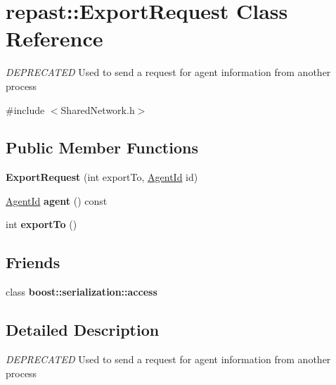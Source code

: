 \hypertarget{classrepast_1_1_export_request}{\section{repast\-:\-:Export\-Request Class Reference}
\label{classrepast_1_1_export_request}
}


{\itshape D\-E\-P\-R\-E\-C\-A\-T\-E\-D} Used to send a request for agent information from another process  




{\ttfamily \#include $<$Shared\-Network.\-h$>$}

\subsection*{Public Member Functions}
\begin{DoxyCompactItemize}
\item 
\hypertarget{classrepast_1_1_export_request_a108d76019feb5c21b7c5560f5da130df}{{\bfseries Export\-Request} (int export\-To, \hyperlink{classrepast_1_1_agent_id}{Agent\-Id} id)}\label{classrepast_1_1_export_request_a108d76019feb5c21b7c5560f5da130df}

\item 
\hypertarget{classrepast_1_1_export_request_a4b3b905a6ee12870c7a729c1263698dc}{\hyperlink{classrepast_1_1_agent_id}{Agent\-Id} {\bfseries agent} () const }\label{classrepast_1_1_export_request_a4b3b905a6ee12870c7a729c1263698dc}

\item 
\hypertarget{classrepast_1_1_export_request_aa33de1bcdafc7cb636ba330c01255eb1}{int {\bfseries export\-To} ()}\label{classrepast_1_1_export_request_aa33de1bcdafc7cb636ba330c01255eb1}

\end{DoxyCompactItemize}
\subsection*{Friends}
\begin{DoxyCompactItemize}
\item 
\hypertarget{classrepast_1_1_export_request_ac98d07dd8f7b70e16ccb9a01abf56b9c}{class {\bfseries boost\-::serialization\-::access}}\label{classrepast_1_1_export_request_ac98d07dd8f7b70e16ccb9a01abf56b9c}

\end{DoxyCompactItemize}


\subsection{Detailed Description}
{\itshape D\-E\-P\-R\-E\-C\-A\-T\-E\-D} Used to send a request for agent information from another process 

